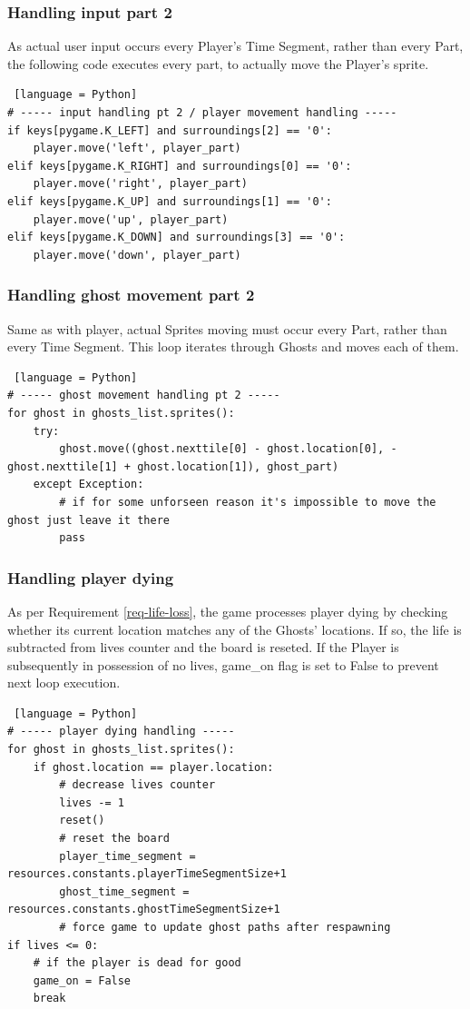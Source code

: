 \documentclass[11pt,a4paper,notitlepage]{report}
\begin{document}
				\subsubsection{Handling input part 2}
					As actual user input occurs every Player's Time Segment, rather than every Part, the following code executes every part, to actually move the Player's sprite.
					\begin{lstlisting} [language = Python]
# ----- input handling pt 2 / player movement handling -----
if keys[pygame.K_LEFT] and surroundings[2] == '0':
	player.move('left', player_part)
elif keys[pygame.K_RIGHT] and surroundings[0] == '0':
	player.move('right', player_part)
elif keys[pygame.K_UP] and surroundings[1] == '0':
	player.move('up', player_part)
elif keys[pygame.K_DOWN] and surroundings[3] == '0':
	player.move('down', player_part)
					\end{lstlisting}
				\subsubsection{Handling ghost movement part 2}
					Same as with player, actual Sprites moving must occur every Part, rather than every Time Segment. This loop iterates through Ghosts and moves each of them.
					\begin{lstlisting} [language = Python]
# ----- ghost movement handling pt 2 -----
for ghost in ghosts_list.sprites():
	try:
		ghost.move((ghost.nexttile[0] - ghost.location[0], -ghost.nexttile[1] + ghost.location[1]), ghost_part)
	except Exception:
		# if for some unforseen reason it's impossible to move the ghost just leave it there
		pass
					\end{lstlisting}
				\subsubsection{Handling player dying}
					As per Requirement \ref{req-life-loss}, the game processes player dying by checking whether its current location matches any of the Ghosts' locations. If so, the life is subtracted from lives counter and the board is reseted. If the Player is subsequently in possession of no lives, game\_on flag is set to False to prevent next loop execution.
					\begin{lstlisting} [language = Python]
# ----- player dying handling -----
for ghost in ghosts_list.sprites():
	if ghost.location == player.location:
		# decrease lives counter
		lives -= 1
		reset()
		# reset the board
		player_time_segment = resources.constants.playerTimeSegmentSize+1
		ghost_time_segment = resources.constants.ghostTimeSegmentSize+1
		# force game to update ghost paths after respawning
if lives <= 0:
	# if the player is dead for good
	game_on = False
	break
					\end{lstlisting}
\end{document}

